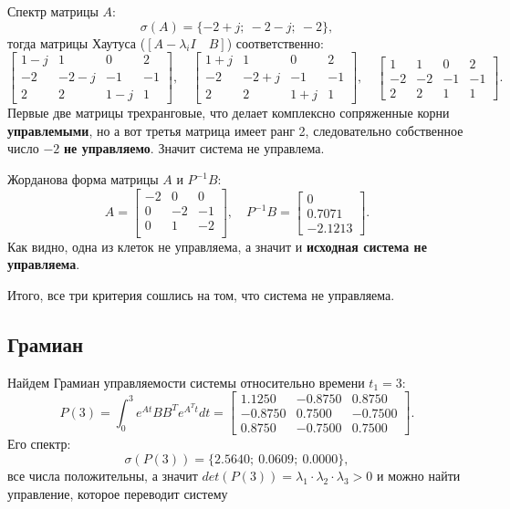 Спектр матрицы $A$:
$$\sigma(A)=\{ -2 + j;\ -2-j;\ -2\},$$
тогда матрицы Хаутуса ($[A-\lambda_iI\quad B]$) соответственно:
\begin{equation*}
    \begin{bmatrix}
        1-j&1&0&2\\
        -2&-2-j&-1&-1\\
        2&2&1-j&1
    \end{bmatrix},\quad 
    \begin{bmatrix}
        1+j&1&0&2\\-2&-2+j&-1&-1\\2&2&1+j&1
    \end{bmatrix},\quad
    \begin{bmatrix}
        1 & 1 & 0 & 2 \\
        -2 & -2 & -1 & -1 \\
        2 & 2 & 1 & 1
    \end{bmatrix}.
\end{equation*}
Первые две матрицы трехранговые, что делает комплексно сопряженные корни
\textbf{управлемыми}, но а вот третья матрица имеет ранг 2, следовательно собственное
число $-2$ \textbf{не управляемо}. Значит система не управлема.

Жорданова форма матрицы $A$ и $P^{-1}B$:
\begin{equation*}
    A =\begin{bmatrix}
        
-2&	   0&	   0\\
0&	  -2&	   -1\\
0&	   1&	  -2\\

    \end{bmatrix},\quad
    P^{-1}B=\begin{bmatrix}
        0 \\ 0.7071 \\ -2.1213
    \end{bmatrix}.
\end{equation*}
Как видно, одна из клеток не управляема, а значит и \textbf{исходная система
не управляема}.

Итого, все три критерия сошлись на том, что система не управляема.

\subsection{Грамиан}

Найдем Грамиан управляемости системы относительно времени $t_1=3$:
\begin{equation*}
    P(3)=\int_{0}^{3}e^{At}BB^Te^{A^Tt}dt=
    \begin{bmatrix}
        1.1250  & -0.8750   & 0.8750\\
        -0.8750  &  0.7500 &  -0.7500\\
         0.8750   &-0.7500&    0.7500
    \end{bmatrix}.
\end{equation*}
Его спектр:
\begin{equation*}
    \sigma(P(3))=\{ 2.5640;\ 
    0.0609;\ 
    0.0000\},
\end{equation*}
все числа положительны, а значит $det(P(3))=\lambda_1\cdot\lambda_2\cdot\lambda_3>0$ и
можно найти управление, которое переводит систему
